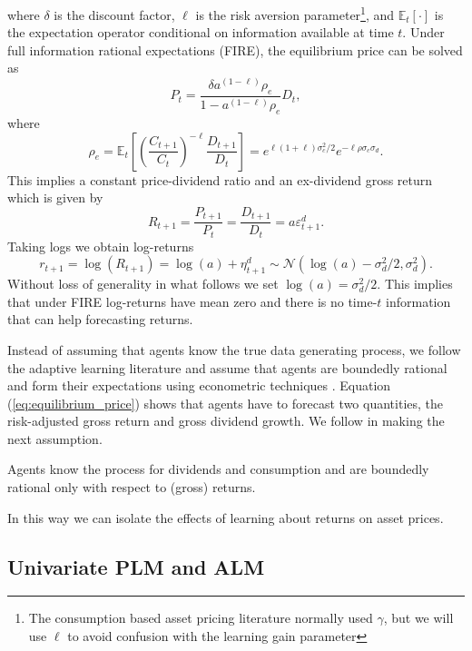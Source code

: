 \documentclass[11pt]{article}
\begin{document}
where $\delta$ is the discount factor, $\ell$ is the risk aversion parameter\footnote{The consumption based asset pricing literature normally used $\gamma$, but we will use $\ell$ to avoid confusion with the learning gain parameter}, and $\mathbb{E}_t[\cdot]$ is the expectation operator conditional on information available at time $t$.
Under full information rational expectations (FIRE), the equilibrium price can be solved as
\begin{equation}
    P_t =  \frac{\delta a^{(1 - \ell)} \rho_e}{1 - a^{(1 - \ell)} \rho_e} D_t,
\end{equation}
where 
\begin{equation}
    \rho_e = \mathbb{E}_t \left[\left( \frac{C_{t+1}}{C_t}\right)^{- \ell} \frac{D_{t+1}}{D_t} \right] = e ^ {\ell(1 + \ell) \sigma^2_c/2} e ^ {-\ell \rho \sigma_c \sigma_d} .
\end{equation}
This implies a constant price-dividend ratio and an ex-dividend gross return which is given by
\begin{equation}
    R_{t+1} = \frac{P_{t+1}}{P_t} = \frac{D_{t+1}}{D_t} = a \varepsilon^d_{t+1}.
\end{equation}
Taking logs we obtain log-returns
\begin{equation}
    r_{t+1} = \log(R_{t+1}) = \log(a) + \eta^d_{t+1} \sim \mathcal{N}(\log(a) - \sigma^2_d/2, \sigma^2_d).
\end{equation}
Without loss of generality in what follows we set $\log(a) = \sigma^2_d/2$. This implies that under FIRE log-returns have mean zero and there is no time-$t$ information that can help forecasting returns.

Instead of assuming that agents know the true data generating process, we follow the adaptive learning literature and assume that agents are boundedly rational and form their expectations using econometric techniques \citep{GeorgeWEvans2001}.
Equation (\ref{eq:equilibrium_price}) shows that agents have to forecast two quantities, the risk-adjusted gross return and gross dividend growth.
We follow \cite{Adam2016} in making the next assumption.

\begin{assumption}
    Agents know the process for dividends and consumption and are boundedly rational only with respect to (gross) returns.
\end{assumption}
In this way we can isolate the effects of learning about returns on asset prices.

\subsection{Univariate PLM and ALM}
\end{document}
